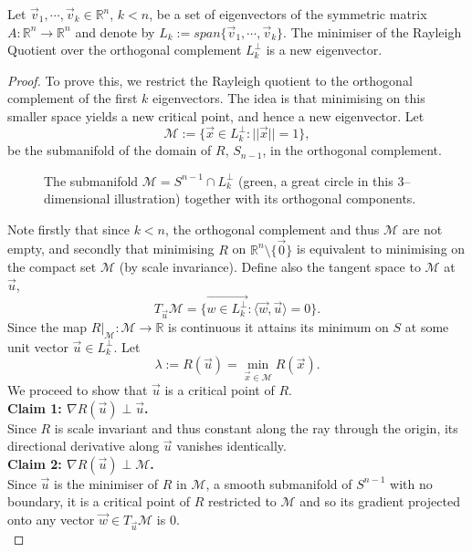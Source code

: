 \begin{lemma} \label{lemma23}
Let $\vec{v}_1,\cdots, \vec{v}_k \in \mathbb{R}^n$, $k<n$, be a set of eigenvectors of the symmetric matrix $A:\mathbb{R}^n\rightarrow\mathbb{R}^n$ and denote by $L_k :=span\{\vec{v}_1,\cdots, \vec{v}_k\}$. The minimiser of the Rayleigh Quotient over the orthogonal complement $L_k^{\perp}$ is a new eigenvector.
\end{lemma}
\begin{proof}
To prove this, we restrict the Rayleigh quotient to the orthogonal complement of the first $k$ eigenvectors. The idea is that minimising on this smaller space yields a new critical point, and hence a new eigenvector. Let $$\mathcal{M}:=\{\vec{x}\in L_{k}^{\perp}:||\vec{x}||=1\},$$ be the submanifold of the domain of $R$, $S_{n-1}$, in the orthogonal complement. 

\begin{figure}
    \centering
    
    \caption{The submanifold $\mathcal{M} = S^{n-1} \cap L_k^\perp$ (green, a great circle in this $3$--dimensional illustration) together with its orthogonal components.}
    \label{fig:placeholder}
\end{figure}
\FloatBarrier

\noindent Note firstly that since $k<n$, the orthogonal complement and thus $\mathcal{M}$ are not empty, and secondly that minimising $R$ on $\mathbb{R}^n\setminus\{\vec{0}\}$ is equivalent to minimising on the compact set $\mathcal{M}$ (by scale invariance). Define also the tangent space to $\mathcal{M}$ at $\vec{u}$, $$T_{\vec{u}}\mathcal{M} = \{ \vec{{w}\in L_k^{\perp} } : \langle \vec{w},\vec{u}\rangle = 0\}.$$ Since the map $R|_{\mathcal{M}}: \mathcal{M} \rightarrow \mathbb{R}$ is continuous it attains its minimum on $S$ at some unit vector $\vec{u}\in L_{k}^{\perp}$.  Let $$\lambda:=R(\vec{u}) = \min_{\vec{x}\in \mathcal{M}} R(\vec{x}).$$ We proceed to show that $\vec{u}$ is a critical point of $R$. \\

\textbf{Claim 1: $\nabla R(\vec{u}) \perp \vec{u}$.} \\
Since $R$ is scale invariant and thus constant along the ray through the origin, its directional derivative along $\vec{u}$ vanishes identically. \\

\textbf{Claim 2: $\nabla R(\vec{u}) \perp \mathcal{M}$.} \\
Since $\vec{u}$ is the minimiser of $R$ in $\mathcal{M}$, a smooth submanifold of $S^{n-1}$ with no boundary, it is a critical point of $R$ restricted to $\mathcal{M}$ and so its gradient projected onto any vector $\vec{w} \in T_{\vec{u}}\mathcal{M}$ is $0$. \\


\end{proof}
